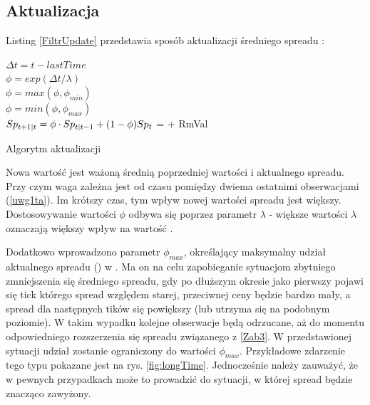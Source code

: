 \documentclass[a4paper,12pt,openany, DIV=calc, headsepline]{scrbook}
\begin{document}

\subsection{Aktualizacja \MSpn}

Listing \ref{FiltrUpdate} przedstawia sposób aktualizacji średniego spreadu \MSpn:
\IncMargin{5em}
\begin{algorithm}

{ $\Delta t = t - lastTime$\\
\label{uwg1ta}	$\phi = exp(\Delta t / \lambda)$\\
\label{uwg2ta}	$\phi = max(\phi, \phi_{min})$\\
\label{uwg3ta} 	$\phi = min(\phi, \phi_{max})$ \\ 
\label{line:akt}	$Sp_{t+1|t} = \phi \cdot Sp_{t|t-1} + (1 - \phi) Sp_{t}$
}
{
\label{Zab3} \MSpn = \MSpc + RmVal\\
}
\DecMargin{5em}

\caption{Algorytm aktualizacji \MSpn \label{FiltrUpdate}}
\end{algorithm}

Nowa wartość \MSpn jest ważoną średnią poprzedniej wartości i aktualnego spreadu. Przy czym  waga \Spt zależna jest od czasu pomiędzy dwiema ostatnimi obserwacjami (\ref{uwg1ta}). Im krótszy czas, tym wpływ nowej wartości spreadu jest większy. Dostosowywanie wartości $\phi$ odbywa się poprzez parametr $\lambda$ - większe wartości $\lambda$ oznaczają większy wpływ \Spt na wartość \MSpn. 

Dodatkowo wprowadzono parametr $\phi_{max}$, określający maksymalny udział aktualnego spreadu (\Spt) w \MSpn. Ma on na celu zapobieganie sytuacjom zbytniego zmniejszenia się średniego spreadu, gdy po dłuższym okresie jako pierwszy pojawi się tick którego spread względem starej, przeciwnej ceny będzie bardzo mały, a spread dla następnych tików się powiększy (lub utrzyma się na podobnym poziomie). W takim wypadku kolejne obserwacje będą odrzucane, aż do momentu odpowiedniego rozszerzenia się spreadu związanego z \ref{Zab3}. W przedstawionej sytuacji udział \Spt zostanie ograniczony do wartości $\phi_{max}$. Przykładowe zdarzenie tego typu pokazane jest na rys. \ref{fig:longTime}. Jednocześnie należy zauważyć, że w pewnych przypadkach może to prowadzić do sytuacji, w której spread będzie znacząco zawyżony. 
\end{document}
